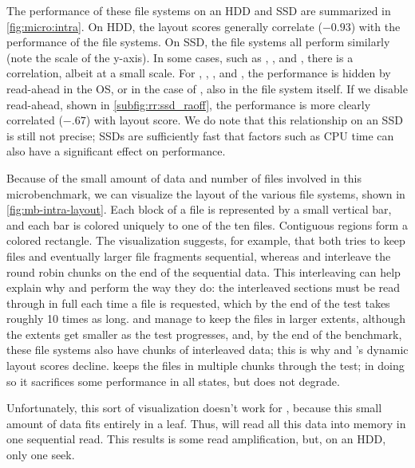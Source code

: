 

The performance of these file systems on an HDD and SSD are summarized in
\cref{fig:micro:intra}. On HDD, the layout scores generally correlate
($-0.93$) with the performance of the file systems.  On SSD, the file systems
all perform similarly (note the scale of the y-axis).  In some cases, such as
\xfs, \ext, and \zfs, there is a correlation, albeit at a small scale.  For
\btrfs, \ext, \xfs, and \ftwofs, the performance is hidden by read-ahead in the
OS, or in the case of \btrfs, also in the file system itself. If we disable
read-ahead, shown in \cref{subfig:rr:ssd_raoff}, the performance is more
clearly correlated ($-.67$) with layout score.  We do note that this
relationship on an SSD is still not precise; SSDs are sufficiently fast that
factors such as CPU time can also have a significant effect on performance.



Because of the small amount of data and number of files involved in this
microbenchmark, we can visualize the layout of the various file systems, shown
in \cref{fig:mb-intra-layout}. Each block of a file is represented by a
small vertical bar, and each bar is colored uniquely to one of the ten files.
Contiguous regions form a colored rectangle.  The visualization suggests, for
example, that \ext both tries to keep files and eventually larger file
fragments sequential, whereas \btrfs and \ftwofs interleave the round robin
chunks on the end of the sequential data. This interleaving can help explain
why \btrfs and \ftwofs perform the way they do: the interleaved sections must
be read through in full each time a file is requested, which by the end of the
test takes roughly 10 times as long. \ext and \xfs manage to keep the files in
larger extents, although the extents get smaller as the test progresses, and,
by the end of the benchmark, these file systems also have chunks of interleaved
data; this is why \ext and \xfs's  dynamic layout scores decline.  \zfs keeps
the files in multiple chunks through the test; in doing so it sacrifices some
performance in all states, but does not degrade.

Unfortunately, this sort of visualization doesn't work for \betrfs, because
this small amount of data fits entirely in a leaf.  Thus, \betrfs will read all
this data into memory in one sequential read. This results is some read
amplification, but, on an HDD, only one seek.



